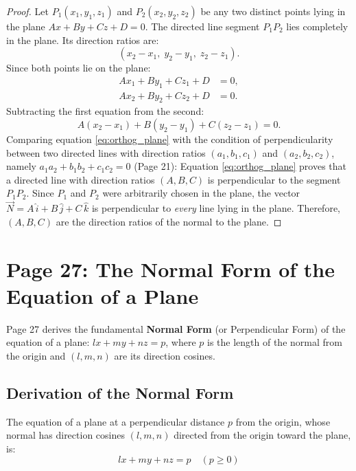 \begin{proof}
Let $P_1(x_1, y_1, z_1)$ and $P_2(x_2, y_2, z_2)$ be any two distinct points lying in the plane $Ax + By + Cz + D = 0$.
The directed line segment $P_1 P_2$ lies completely in the plane. Its direction ratios are:
\begin{equation}
    (x_2 - x_1, \; y_2 - y_1, \; z_2 - z_1).
\end{equation}
Since both points lie on the plane:
\begin{align}
    Ax_1 + By_1 + Cz_1 + D &= 0, \\
    Ax_2 + By_2 + Cz_2 + D &= 0.
\end{align}
Subtracting the first equation from the second:
\begin{equation}
    A(x_2 - x_1) + B(y_2 - y_1) + C(z_2 - z_1) = 0. \label{eq:orthog_plane}
\end{equation}
Comparing equation \eqref{eq:orthog_plane} with the condition of perpendicularity between two directed lines with direction ratios $(a_1,b_1,c_1)$ and $(a_2,b_2,c_2)$, namely $a_1 a_2 + b_1 b_2 + c_1 c_2 = 0$ (Page 21):
Equation \eqref{eq:orthog_plane} proves that a directed line with direction ratios $(A, B, C)$ is perpendicular to the segment $P_1 P_2$.
Since $P_1$ and $P_2$ were arbitrarily chosen in the plane, the vector $\vec{N} = A\,\hat{i} + B\,\hat{j} + C\,\hat{k}$ is perpendicular to \emph{every} line lying in the plane.
Therefore, $(A, B, C)$ are the direction ratios of the normal to the plane.
\end{proof}

\section{Page 27: The Normal Form of the Equation of a Plane}
\label{sec:page27}

\begin{conceptbox}
Page 27 derives the fundamental \textbf{Normal Form} (or Perpendicular Form) of the equation of a plane: $lx + my + nz = p$, where $p$ is the length of the normal from the origin and $(l, m, n)$ are its direction cosines.
\end{conceptbox}

\subsection{Derivation of the Normal Form}
\begin{theorembox}
The equation of a plane at a perpendicular distance $p$ from the origin, whose normal has direction cosines $(l, m, n)$ directed from the origin toward the plane, is:
\begin{equation}
    \boxed{lx + my + nz = p} \quad (p \ge 0)
\end{equation}
\end{theorembox}


